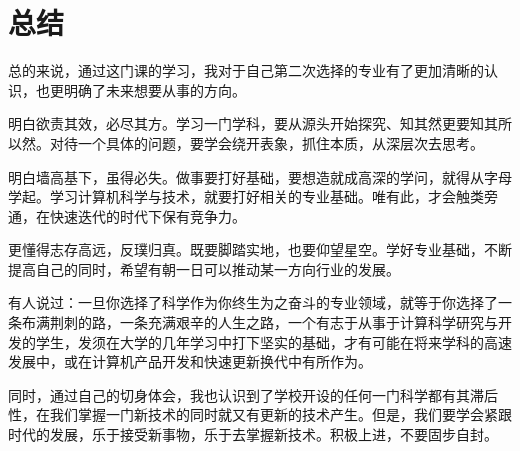 \documentclass{article}
\begin{document}
\section{总结}
总的来说，通过这门课的学习，我对于自己第二次选择的专业有了更加清晰的认识，也更明确了未来想要从事的方向。\par
明白欲责其效，必尽其方。学习一门学科，要从源头开始探究、知其然更要知其所以然。对待一个具体的问题，要学会绕开表象，抓住本质，从深层次去思考。\par
明白墙高基下，虽得必失。做事要打好基础，要想造就成高深的学问，就得从字母学起。学习计算机科学与技术，就要打好相关的专业基础。唯有此，才会触类旁通，在快速迭代的时代下保有竞争力。\par
更懂得志存高远，反璞归真。既要脚踏实地，也要仰望星空。学好专业基础，不断提高自己的同时，希望有朝一日可以推动某一方向行业的发展。\par
有人说过：一旦你选择了科学作为你终生为之奋斗的专业领域，就等于你选择了一条布满荆刺的路，一条充满艰辛的人生之路，一个有志于从事于计算科学研究与开发的学生，发须在大学的几年学习中打下坚实的基础，才有可能在将来学科的高速发展中，或在计算机产品开发和快速更新换代中有所作为。\par
同时，通过自己的切身体会，我也认识到了学校开设的任何一门科学都有其滞后性，在我们掌握一门新技术的同时就又有更新的技术产生。但是，我们要学会紧跟时代的发展，乐于接受新事物，乐于去掌握新技术。积极上进，不要固步自封。\par



\newpage
\end{document}
